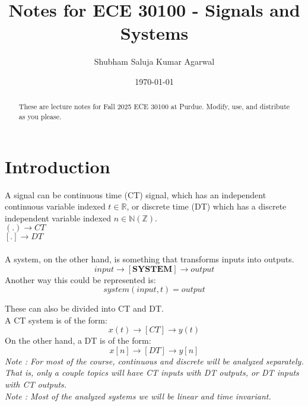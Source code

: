 \documentclass[nobib]{tufte-handout}
\title{Notes for ECE 30100 - Signals and Systems}
\author[Shubham Saluja Kumar Agarwal]{Shubham Saluja Kumar Agarwal}
\date{\today}  %
\begin{document}
\maketitle

\begin{abstract}
    These are lecture notes for Fall 2025 ECE 30100 at Purdue. Modify, use, and distribute as you please.
\end{abstract}

\tableofcontents

\newpage

\section{Introduction}
A signal can be continuous time (CT) signal, which has an independent
continuous variable indexed $t\in \mathbb{R}$, or discrete time (DT) which has
a discrete independent variable indexed $n\in \mathbb{N}(\mathbb{Z})$.\\

$(.) \rightarrow CT$ \\
$[.] \rightarrow DT$\\~\\

A system, on the other hand, is something that transforms inputs into outputs.
\begin{equation*}
    input \rightarrow [\mathbf{SYSTEM}] \rightarrow output
\end{equation*}
Another way this could be represented is:
\begin{equation*}
    system(input,t) = output
\end{equation*}

These can also be divided into CT and DT.\\ A CT system is of the form:
\begin{equation*}
    x(t) \rightarrow [CT] \rightarrow y(t)
\end{equation*}
On the other hand, a DT is of the form:
\begin{equation*}
    x[n] \rightarrow [DT] \rightarrow y[n]
\end{equation*}
\textit{Note : For most of the course, continuous and discrete will be analyzed separately. That is, only a couple topics will have CT inputs with DT outputs, or DT inputs with CT outputs.}\\
\textit{Note : Most of the analyzed systems we will be linear and time invariant.}\\
\end{document}
